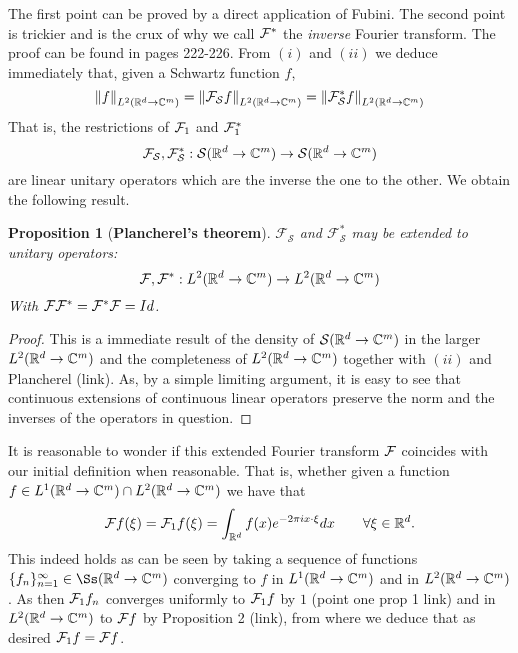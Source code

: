 \documentclass[12pt]{article}
\newtheorem{proposition}{Proposition}
\begin{document}
The first point can be proved by a direct application of Fubini. The second point is trickier and is the crux of why we call $\mathcal{F}^*$ the \emph{inverse} Fourier transform. The proof can be found in \cite{Tay} pages 222-226.
From $(i)$ and $(ii)$ we deduce immediately that, given a Schwartz function $f$,
\begin{equation}\label{Plancherel}
	\norm{f}_{L^2({\mathbb R}^d\to\mathbb{C}^m)}=\norm{\mathcal{F}_\mathcal{S}f}_{L^2({\mathbb R}^d\to\mathbb{C}^m)}=\norm{\mathcal{F}_\mathcal{S}^*f}_{L^2({\mathbb R}^d\to\mathbb{C}^m)}
\end{equation}
That is, the restrictions of $\mathcal{F}_1$ and $\mathcal{F}^*_1$ \[\mathcal{F}_\mathcal{S},\mathcal{F}_\mathcal{S}^*:\mathcal{S}({\mathbb R}^d\to\mathbb{C}^m)\to\mathcal{S}({\mathbb R}^d\to\mathbb{C}^m)\]
are linear unitary operators which are the inverse the one to the other. We obtain the following result.\bigbreak
\begin{proposition}[\textbf{Plancherel's theorem}]\label{Plancherel's Theorem}\bigbreak $\mathcal{F}_\mathcal{S}$ and $\mathcal{F}_\mathcal{S}^*$ may be extended to unitary operators:
\[\mathcal{F},\mathcal{F}^*:L^2({\mathbb R}^d\to\mathbb{C}^m)\to L^2({\mathbb R}^d\to\mathbb{C}^m)\]
With $\mathcal{F}\mathcal{F}^*=\mathcal{F}^*\mathcal{F}=Id$.
\end {proposition}
\begin{proof}
	This is a immediate result of the density of $\mathcal{S}({\mathbb R}^d\to\mathbb{C}^m)$ in the larger $L^2({\mathbb R}^d\to\mathbb{C}^m)$ and the completeness of $L^2({\mathbb R}^d\to\mathbb{C}^m)$ together with $(ii)$ and Plancherel (link). As, by a simple limiting argument, it is easy to see that continuous extensions of continuous linear operators preserve the norm and the inverses of the operators in question.
\end{proof}
It is reasonable to wonder if this extended Fourier transform $\mathcal{F}$ coincides with our initial definition when reasonable.
That is, whether given a function $f \in L^1({\mathbb R}^d\to\mathbb{C}^m)\cap L^2({\mathbb R}^d\to\mathbb{C}^m)$ we have that
\[\mathcal{F} f(\xi)=\mathcal{F}_1f(\xi)=\int_{{\mathbb R}^d}f(x)e^{-2\pi ix\cdot \xi} dx\qquad\forall \xi\in{\mathbb R}^d.\]
This indeed holds as can be seen by taking a sequence of functions $\lbrace f_n\rbrace_{n=1}^\infty\in\Ss(\R^d\to\C^m)$ converging to $f$ in  $L^1({\mathbb R}^d\to\mathbb{C}^m)$ and in $L^2({\mathbb R}^d\to\mathbb{C}^m)$.
As then $\mathcal{F}_1 f_n$ converges uniformly to $\mathcal{F}_1f$ by $1$ (point one prop 1 link) and in $L^2({\mathbb R}^d\to\mathbb{C}^m)$ to $\mathcal{F} f$ by Proposition 2 (link), from where we deduce that as desired $\mathcal{F}_1f=\mathcal{F} f$. \bigbreak
\end{document}
